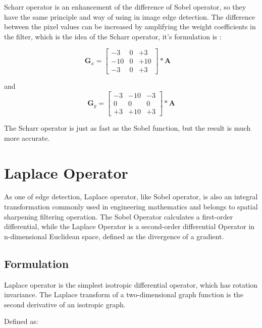 \documentclass[review]{cvpr}
\begin{document}
Scharr operator is an enhancement of the difference of Sobel operator, so they have the same principle and way of using in image edge detection. The difference between the pixel values can be increased by amplifying the weight coefficients in the filter, which is the idea of the Scharr operator, it's formulation is :

\begin{equation}
  \mathbf{G}_{x}=\left[\begin{array}{lll}-3 & 0 & +3 \\ -10 & 0 & +10 \\ -3 & 0 & +3\end{array}\right] * \mathbf{A} \quad
\end{equation}


and \\

\begin{equation}
  \mathbf{G}_{y}=\left[\begin{array}{ccc}-3 & -10 & -3 \\ 0 & 0 & 0 \\ +3 & +10 & +3\end{array}\right] * \mathbf{A}
\end{equation}


The Scharr operator is just as fast as the Sobel function, but the result is much more accurate.

\section{Laplace Operator}

As one of edge detection, Laplace operator, like Sobel operator, is also an integral transformation commonly used in engineering mathematics and belongs to spatial sharpening filtering operation. The Sobel Operator calculates a first-order differential, while the Laplace Operator is a second-order differential Operator in n-dimensional Euclidean space, defined as the divergence of a gradient.

\subsection{Formulation}
Laplace operator is the simplest isotropic differential operator, which has rotation invariance. The Laplace transform of a two-dimensional graph function is the second derivative of an isotropic graph. 

Defined as:
\end{document}
